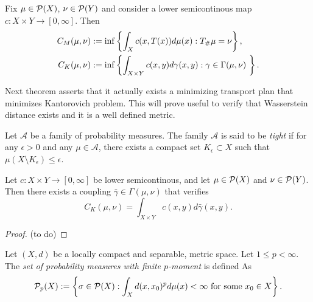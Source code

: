 \begin{definition}
    Fix $ \mu \in \mathcal P(X)$, $\nu \in \mathcal P(Y)$ and consider a lower semicontinous map $ c: X \times Y \to [0, \infty] $. Then
\begin{align*}
    C_M(\mu, \nu) &:= \inf \left\{\int_X c(x, T(x)) d\mu(x) : T_\#\mu = \nu \right\}, \\
    C_K(\mu, \nu) &:= \inf \left\{\int_{X \times Y} c(x, y) d\gamma(x,y) : \gamma \in \Gamma(\mu, \nu) \ \right\}.
\end{align*}
\end{definition}

Next theorem asserts that it actually exists a minimizing transport plan that minimizes Kantorovich problem. This will prove useful to verify that Wasserstein distance exists and it is a well defined metric.

\begin{definition}
    Let $ \mathcal A $ be a family of probability measures. The family $ \mathcal A $ is said to be {\it tight} if for any $ \epsilon > 0 $ and any $ \mu \in \mathcal A $, there exists a compact set $ K_\epsilon \subset X $ such that $ \mu (X \setminus K_\epsilon) \leq \epsilon $.
\end{definition}

\begin{theorem}
    Let $ c: X \times Y \to [0, \infty] $ be lower semicontinous, and let $ \mu \in \mathcal P(X) $ and $ \nu \in \mathcal P(Y) $. Then there exists a coupling $ \bar \gamma \in \Gamma(\mu, \nu) $ that verifies
    $$
    C_K(\mu, \nu) = \int_{X \times Y} c(x, y) d \bar \gamma(x,y).
    $$
\end{theorem}
\begin{proof}
    (to do)
\end{proof}

\begin{example}
    
\end{example}

\begin{definition}
    Let $ (X, d) $ be a locally compact and separable, metric space. Let $ 1 \leq p < \infty $. The {\it set of probability measures with finite $p$-moment} is defined As
    $$
        \mathcal P_p (X) := \left\{ \sigma \in \mathcal P (X) : \int_X d(x, x_0)^p d \mu (x) < \infty \text{ for some } x_0 \in X \right\}.
    $$
\end{definition}

